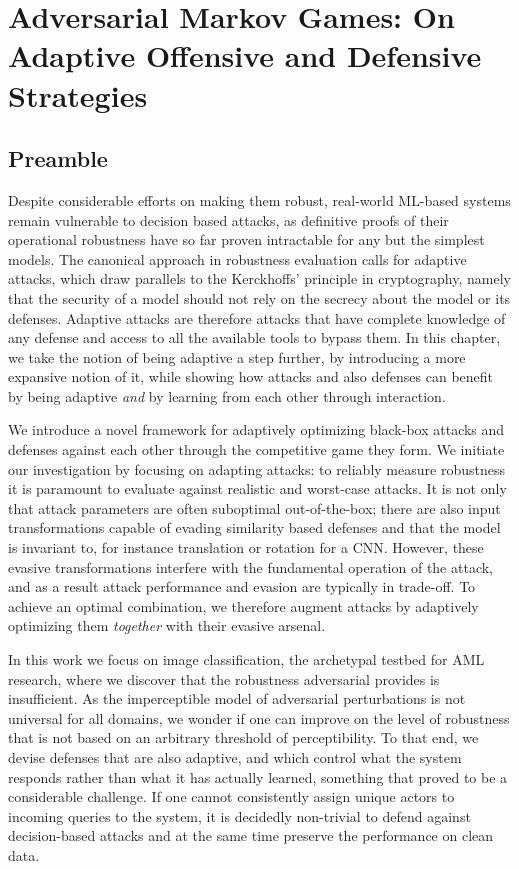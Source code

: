 \chapter{Adversarial Markov Games: On Adaptive Offensive and Defensive Strategies}\label{ch:markovgames}
\label{ch:markovgames}

\section*{Preamble}

Despite considerable efforts on making them robust, real-world ML-based systems remain vulnerable to decision based attacks, as definitive proofs of their operational robustness have so far proven intractable for any but the simplest models.
The canonical approach in robustness evaluation calls for adaptive attacks, which draw parallels to the Kerckhoffs' principle in cryptography, namely that the security of a model should not rely on the secrecy about the model or its defenses. 
Adaptive attacks are therefore attacks that have complete knowledge of any defense and access to all the available tools to bypass them.
In this chapter, we take the notion of being adaptive a step further, by introducing a more expansive notion of it, while showing how attacks and also defenses can benefit by being adaptive \emph{and} by learning from each other through interaction.

We introduce a novel framework for adaptively optimizing black-box attacks and defenses against each other through the competitive game they form.
We initiate our investigation by focusing on adapting attacks: to reliably measure robustness it is paramount to evaluate against realistic and worst-case attacks.
It is not only that attack parameters are often suboptimal out-of-the-box; there are also input transformations capable of evading similarity based defenses and that the model is invariant to, for instance translation or rotation for a \gls{CNN}.
However, these evasive transformations interfere with the fundamental operation of the attack, and as a result attack performance and evasion are typically in trade-off.
To achieve an optimal combination, we therefore augment attacks by adaptively optimizing them \textit{together} with their evasive arsenal.

In this work we focus on image classification, the archetypal testbed for \gls{AML} research, where we discover that the robustness adversarial provides is insufficient.
As the imperceptible model of adversarial perturbations is not universal for all domains, we wonder if one can improve on the level of robustness that is not based on an arbitrary threshold of perceptibility.
To that end, we devise defenses that are also adaptive, and which control what the system responds rather than what it has actually learned, something that proved to be a considerable challenge.
If one cannot consistently assign unique actors to incoming queries to the system, it is decidedly non-trivial to defend against decision-based attacks and at the same time preserve the performance on clean data.

